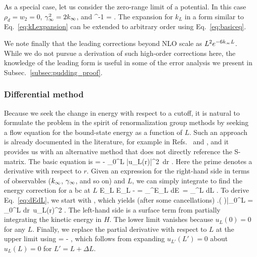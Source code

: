 	As a special case, let us consider the zero-range limit of a
	potential. In this case $\rho_d = w_2 = 0$, $\gamma_\infty^2 = 2k_{\infty}$, and
	\beq
	   [s_0(ik_L)]^{-1} = \;.
	\eeq
	The expansion for $k_L$ in a form similar to Eq.~\eqref{eq:kLexpansion}
	can be extended to arbitrary order using Eq.~\eqref{eq:basiceq}.

	We note finally that the leading corrections beyond NLO scale as $L^2
	e^{-6k_{\infty} L}$. While we do not pursue a derivation of such high-order
	corrections here, the knowledge of the leading form is useful in some of
	the error analysis we present in Subsec.~\ref{subsec:pudding_proof}.

	\medskip
	\subsubsection{Differential method}

	Because we seek the change in energy with respect to a cutoff, it is
	natural to formulate the problem in the spirit of renormalization
	group methods by seeking a flow equation for the bound-state energy as
	a function of $L$.  Such an approach is already documented in the
	literature, for example in Refs.~\cite{Arteca1984} and
	\cite{Fernandez1981}, and it provides us with an alternative method that
	does not directly reference the S-matrix.  The basic equation is
	\beq
	   = - 
		{\int_0^L |u_L(r)|^2\, dr}
	  \;.
	  \label{eq:dEdL}
	\eeq
	Here the prime denotes a derivative with respect to $r$.  Given an
	expression for the right-hand side in terms of observables ($k_{\infty}$,
	$\gamma_\infty$, and so on) and $L$, we can simply integrate to find the energy
	correction for a bc at $L$
	\beq
	  \Delta E_L \equiv E_L - \Einf = \int_{\Einf}^{E_L}\! dE\,
	     = \int_\infty^L\!  dL
	     \;.
	\eeq
	To derive Eq.~\eqref{eq:dEdL}, we start with
	\beq
	  \left [
	   \int_0^L u_L(r) H u_L(r)\, dr = E_L \int_0^L\! dr\, u_L(r)^2
	  \right]
	  \;,
	\eeq
	which yields (after some cancellations)
	\beq
	     \left.\left( 
	         \right)\right|_0^L
	   =
	   \int_0^L\! dr\, u_L(r)^2
	         \;.
	         \label{eq:DeltaEL}
	\eeq
	The left-hand side is a surface term from partially integrating the
	kinetic energy in $H$.  The lower limit vanishes because $u_L(0) = 0$
	for any $L$.  Finally, we replace the partial derivative with respect
	to $L$ at the upper limit using
	\beq
	    = - 
	   \;,
	\eeq
	which follows from expanding $u_{L'}(L') = 0$ about $u_{L}(L) = 0$ for
	$L' = L + \Delta L$.


